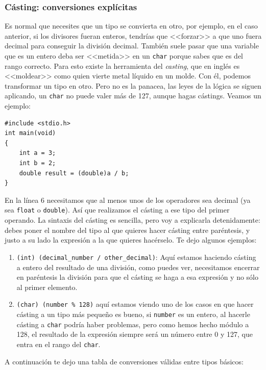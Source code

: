 \documentclass[a4paper]{article}
\begin{document}
\subsubsection{Cásting: conversiones explícitas}
Es normal que necesites que un tipo se convierta en otro, por ejemplo, en el
caso anterior, si los divisores fueran enteros,
tendrías que <<forzar>> a que uno fuera decimal para conseguir la división decimal.
También suele pasar que una variable que es un entero
deba ser <<metida>> en un \verb!char! porque sabes que es del rango correcto.
Para esto existe la herramienta del \textit{casting}, que en inglés es
<<moldear>> como quien vierte metal líquido en un molde. Con él, podemos
transformar un tipo en otro. Pero no es la panacea, las leyes de la lógica se
siguen aplicando, un \verb"char" no puede valer más de 127, aunque hagas
cástings. Veamos un ejemplo:



\noindent
\begin{minipage}[H]{\linewidth}
\mbox{}
\begin{lstlisting}[style=C, caption={Ejemplo de cásting},
label={lst:castingExample}]
#include <stdio.h>
int main(void)
{
    int a = 3;
    int b = 2;
    double result = (double)a / b;
}
\end{lstlisting}
\end{minipage}



En la línea 6 necesitamos que al menos unos de los operadores sea decimal
(ya sea \texttt{float} o \texttt{double}). Así que realizamos el cásting
a ese tipo del primer operando. La sintaxis del cásting es sencilla, pero
voy a explicarla detenidamente: debes poner el nombre del tipo al que quieres
hacer cásting entre paréntesis, y justo a su lado la expresión a la que quieres
hacérselo. Te dejo algunos ejemplos:
\begin{enumerate}
\item \lstinline[style=C]!(int) (decimal_number / other_decimal)!: Aquí
estamos haciendo cásting a entero del resultado de una división, como puedes
ver, necesitamos encerrar en paréntesis la división para que el cásting se haga
a esa expresión y no sólo al primer elemento.
\item \lstinline[style=C]!(char) (number % 128)! aquí estamos viendo uno
de los casos en que hacer cásting a un tipo más pequeño es bueno, si
\texttt{number} es un entero, al hacerle cásting a \verb!char!
podría haber problemas,
pero como hemos hecho módulo a 128, el resultado de la expresión siempre será
un número entre 0 y 127, que entra en el rango del \texttt{char}.
\end{enumerate}
A continuación te dejo una tabla de
conversiones válidas entre tipos básicos:
\end{document}
